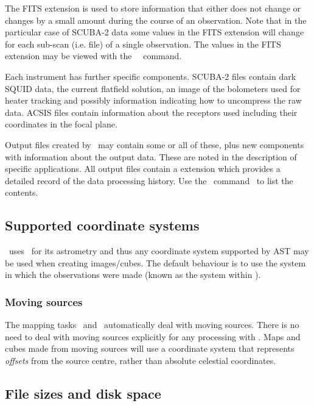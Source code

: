 \documentclass[oneside,11pt]{starlink}
\begin{document}
The FITS extension is used to store information that either does not
change or changes by a small amount during the course of an observation.
Note that in the particular case of SCUBA-2 data some values in the FITS
extension will change for each sub-scan (i.e. file) of a single
observation. The values in the FITS extension may be viewed with the
\KAPPA\ \fitslist\ command.

Each instrument has further specific components. SCUBA-2 files contain
dark SQUID data, the current flatfield solution, an image of the
bolometers used for heater tracking and possibly information
indicating how to uncompress the raw data. ACSIS files contain
information about the receptors used including their coordinates in
the focal plane.

Output files created by \SMURF\ may contain some or all of these, plus
new components with information about the output data. These are noted
in the description of specific applications. All output files contain
a  extension which provides a detailed record of
the data processing history. Use the \KAPPA\ command \provshow\ to list
the contents.

\subsection{Supported coordinate systems}

\SMURF\ uses \Ast\ for its astrometry and thus any coordinate
system supported by AST may be used when creating images/cubes. The
default behaviour is to use the system in which the observations
were made (known as the  system within \SMURF).

\subsubsection{Moving sources}

The mapping tasks \makemap\ and \makecube\ automatically
deal with moving sources. There is no need to deal with moving sources
explicitly for any processing with \SMURF. Maps and cubes made from
moving sources will use a coordinate system that represents \emph{offsets}
from the source centre, rather than absolute celestial coordinates.

\subsection{File sizes and disk space}
\end{document}
